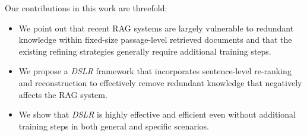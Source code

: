Our contributions in this work are threefold:
\vspace{-0.075in}
\begin{itemize}
  \item We point out that recent RAG systems are largely vulnerable to redundant knowledge within fixed-size passage-level retrieved documents and that the existing refining strategies generally require additional training steps.
  \item We propose a \textit{DSLR} framework that incorporates sentence-level re-ranking and reconstruction to effectively remove redundant knowledge that negatively affects the RAG system.
  \item We show that \textit{DSLR} is highly effective and efficient even without additional training steps in both general and specific scenarios.
\end{itemize}


